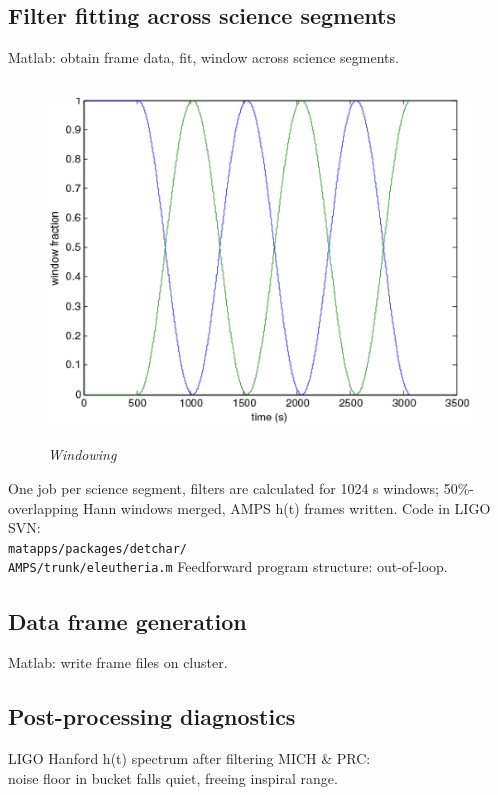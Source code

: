         \subsection{Filter fitting across science segments}
        \label{filter_fitting-out-of-loop}

            Matlab: obtain frame data, fit, window across science segments.

\begin{figure}
\includegraphics[height=95mm,width=120mm]{hann-windows.eps}
\caption{\textit{Windowing}}
\end{figure}
One job per science segment, filters are calculated for 1024 s windows;
50\%-overlapping Hann windows merged, AMPS h(t) frames written. Code in LIGO SVN:\\
\texttt{matapps/packages/detchar/}\\
\texttt{AMPS/trunk/eleutheria.m}
        Feedforward program structure: out-of-loop.

        \subsection{Data frame generation}
        \label{data_frames}
        
            Matlab: write frame files on cluster.

        \subsection{Post-processing diagnostics}
        \label{diagnostics}
 
LIGO Hanford h(t) spectrum after filtering MICH \& PRC:\\
noise floor in bucket falls quiet, freeing inspiral range.

